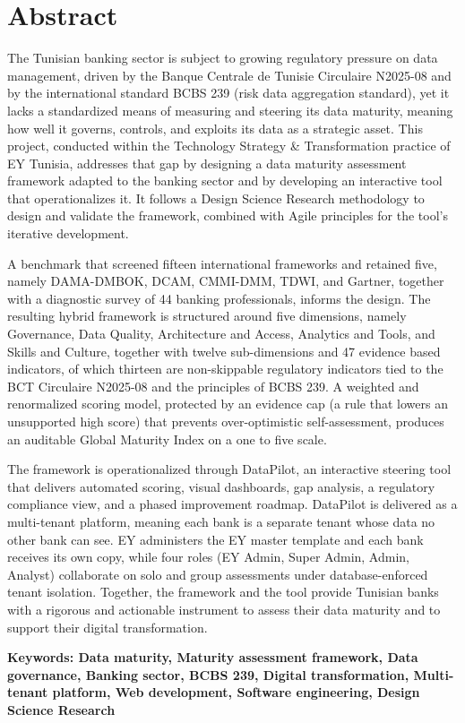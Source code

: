 
\section*{\hfill Abstract \hfill}


\vspace{1.4cm}
\large
\noindent
The Tunisian banking sector is subject to growing regulatory pressure on data management, driven by the Banque Centrale de Tunisie Circulaire N\textdegree{}2025-08 and by the international standard BCBS 239 (risk data aggregation standard), yet it lacks a standardized means of measuring and steering its data maturity, meaning how well it governs, controls, and exploits its data as a strategic asset. This project, conducted within the Technology Strategy \& Transformation practice of EY Tunisia, addresses that gap by designing a data maturity assessment framework adapted to the banking sector and by developing an interactive tool that operationalizes it. It follows a Design Science Research methodology to design and validate the framework, combined with Agile principles for the tool's iterative development.

\noindent
A benchmark that screened fifteen international frameworks and retained five, namely DAMA-DMBOK, DCAM, CMMI-DMM, TDWI, and Gartner, together with a diagnostic survey of 44 banking professionals, informs the design. The resulting hybrid framework is structured around five dimensions, namely Governance, Data Quality, Architecture and Access, Analytics and Tools, and Skills and Culture, together with twelve sub-dimensions and 47 evidence based indicators, of which thirteen are non-skippable regulatory indicators tied to the BCT Circulaire N\textdegree{}2025-08 and the principles of BCBS 239. A weighted and renormalized scoring model, protected by an evidence cap (a rule that lowers an unsupported high score) that prevents over-optimistic self-assessment, produces an auditable Global Maturity Index on a one to five scale.

\noindent
The framework is operationalized through DataPilot, an interactive steering tool that delivers automated scoring, visual dashboards, gap analysis, a regulatory compliance view, and a phased improvement roadmap. DataPilot is delivered as a multi-tenant platform, meaning each bank is a separate tenant whose data no other bank can see. EY administers the EY master template and each bank receives its own copy, while four roles (EY Admin, Super Admin, Admin, Analyst) collaborate on solo and group assessments under database-enforced tenant isolation. Together, the framework and the tool provide Tunisian banks with a rigorous and actionable instrument to assess their data maturity and to support their digital transformation.

\vspace{0.6cm}
\noindent
\textbf{Keywords: Data maturity, Maturity assessment framework, Data governance, Banking sector, BCBS 239, Digital transformation, Multi-tenant platform, Web development, Software engineering, Design Science Research}
